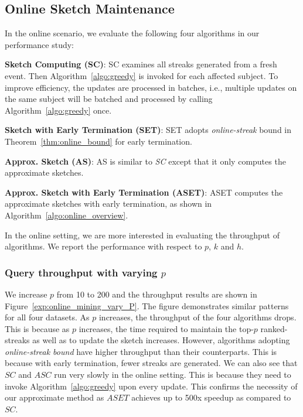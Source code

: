 \subsection{Online Sketch Maintenance}
\label{subsec:exp-online}
In the online scenario, we evaluate the following four algorithms in our performance study:


\noindent\textbf{Sketch Computing (SC)}: SC examines all streaks generated from a fresh event.
Then Algorithm~\ref{algo:greedy} is invoked for each affected subject.
To improve efficiency, the updates are processed in batches, i.e., multiple updates on the same subject will be batched and processed by calling Algorithm~\ref{algo:greedy} once.

\noindent\textbf{Sketch with Early Termination (SET)}: SET adopts \emph{online-streak} bound in Theorem~\ref{thm:online_bound} for early termination.

\noindent\textbf{Approx. Sketch (AS)}: AS is similar to \emph{SC} except that it only computes the approximate sketches. 

\noindent\textbf{Approx. Sketch with Early Termination (ASET)}: ASET computes the approximate sketches with early termination, as shown in Algorithm~\ref{algo:online_overview}.

In the online setting, we are more interested in evaluating the throughput of algorithms. We report the performance with respect to $p$, $k$ and $h$.

\subsubsection{Query throughput with varying $p$}
We increase $p$ from 10 to 200 and the throughput results are 
shown in Figure~\ref{exp:online_mining_vary_P}.
The figure demonstrates similar patterns for all four datasets. As $p$ increases, 
the throughput of the four algorithms drops.
This is because as $p$ increases, the time required to maintain the top-$p$ ranked-streaks
as well as to update the sketch increases.
However, algorithms adopting 
\emph{online-streak bound} have higher throughput than their counterparts. 
This is because with early termination,
fewer streaks are generated. 
We can also see that $SC$ and $ASC$ run very slowly in the online setting. 
This is because they need to invoke Algorithm~\ref{algo:greedy} upon every update.
This confirms the necessity of our approximate method as $ASET$ achieves up to 500x speedup as compared to $SC$.

